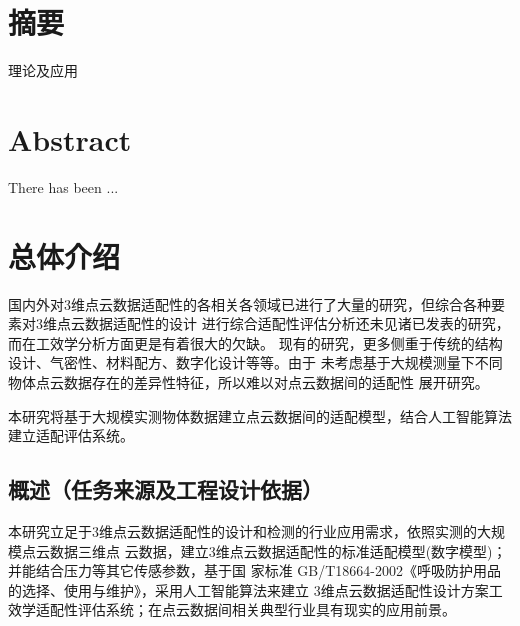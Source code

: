 \documentclass[a4paper,12pt]{ctexbook}	%
\begin{document}

\chapter[中文摘要]{摘要}

理论及应用

\chapter[英文摘要]{Abstract}

There has been ...


\tableofcontents

\thispagestyle{empty}

\mainmatter		%


\setcounter{page}{1}
\chapter{总体介绍}

国内外对3维点云数据适配性的各相关各领域已进行了大量的研究，但综合各种要素对3维点云数据适配性的设计
进行综合适配性评估分析还未见诸已发表的研究，而在工效学分析方面更是有着很大的欠缺。
现有的研究，更多侧重于传统的结构设计、气密性、材料配方、数字化设计等等。由于
未考虑基于大规模测量下不同物体点云数据存在的差异性特征，所以难以对点云数据间的适配性
展开研究。

{\heiti
本研究将基于大规模实测物体数据建立点云数据间的适配模型，结合人工智能算法建立适配评估系统。
}

\section{概述（任务来源及工程设计依据）}

本研究立足于3维点云数据适配性的设计和检测的行业应用需求，依照实测的大规模点云数据三维点
云数据，建立3维点云数据适配性的标准适配模型(数字模型)；并能结合压力等其它传感参数，基于国
家标准 GB/T18664-2002《呼吸防护用品的选择、使用与维护》，采用人工智能算法来建立
3维点云数据适配性设计方案工效学适配性评估系统；在点云数据间相关典型行业具有现实的应用前景。
\end{document}
